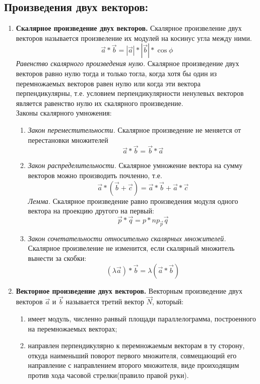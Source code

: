 \documentclass{article}
\begin{document}
\subsection{Произведения двух векторов:}
\begin{enumerate}
    \item \textbf{Скалярное произведение двух векторов.} Скалярное произвеление двух векторов называется произвеление их модулей на косинус угла между ними.
    $$\vec{a}*\vec{b} = |\vec{a}|*|\vec{b}|*\cos\phi$$
    \textit{Равенство скалярного произведения нулю.} Скалярное произведение двух векторов равно нулю тогда и только тогла, когда хотя бы один из перемножаемых векторов равен нулю или когда эти вектора перпендикулярны, т.е. условием перпендикулярности ненулевых векторов является равенство нулю их скалярного произведение. \\
    Законы скалярного умножения:
    \begin{enumerate}
        \item \textit{Закон переместительности.} Скалярное произведение не меняется от перестановки множителей
        $$\vec{a}*\vec{b} = \vec{b} * \vec{a}$$
        \item \textit{Закон распределительности.} Скалярное умножение вектора на сумму векторов можно производить почленно, т.е.
        $$\vec{a}*(\vec{b}+\vec{c}) = \vec{a}*\vec{b}+\vec{a}*\vec{c}$$
        \textit{Лемма.} Скалярное произведение равно произведения модуля одного вектора на проекцию другого на первый:
        $$\vec{p}*\vec{q} = p*np_{\vec{p}}\vec{q}$$
        \item \textit{Закон сочетательности относительно скалярных множителей.} Скалярное произвеление не изменится, если скалярный множитель вынести за скобки:
        $$(\lambda\vec{a})*\vec{b} = \lambda(\vec{a}*\vec{b})$$
    \end{enumerate}
    \item \textbf{Векторное произведение двух векторов.} Векторным произведение двух векторов $\vec{a}$ и $\vec{b}$ называется третий вектор $\vec{N}$, который:
    \begin{enumerate}
        \item имеет модуль, численно ранвый площади параллелограмма, построенного на перемножаемых векторах;
        \item направлен перпендикулярно к перемножаемым векторам в ту сторону, откуда наименьший поворот первого множителя, совмещающий его направление с направлением второго множителя, виде проиходящим против хода часовой стрелки(правило правой руки).

\end{enumerate}
\end{enumerate}
\end{document}
